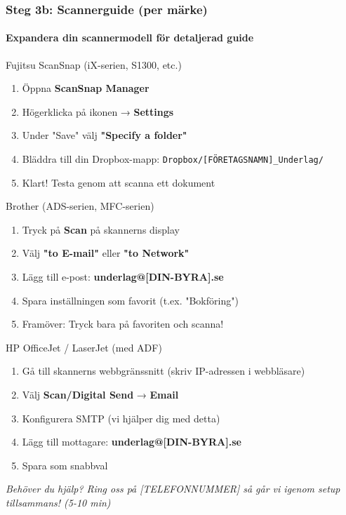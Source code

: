 \documentclass[10pt]{beamer}
\begin{document}
\begin{frame}[fragile]
  \frametitle{Steg 3b: Scannerguide (per märke)}
  \framesubtitle{Expandera din scannermodell för detaljerad guide}

  \begin{block}{Fujitsu ScanSnap (iX-serien, S1300, etc.)}
    \footnotesize
    \begin{enumerate}
      \item Öppna \textbf{ScanSnap Manager}
      \item Högerklicka på ikonen → \textbf{Settings}
      \item Under "Save" välj \textbf{"Specify a folder"}
      \item Bläddra till din Dropbox-mapp: \texttt{Dropbox/[FÖRETAGSNAMN]\_Underlag/}
      \item Klart! Testa genom att scanna ett dokument
    \end{enumerate}
  \end{block}

  \vspace{0.3cm}

  \begin{block}{Brother (ADS-serien, MFC-serien)}
    \footnotesize
    \begin{enumerate}
      \item Tryck på \textbf{Scan} på skannerns display
      \item Välj \textbf{"to E-mail"} eller \textbf{"to Network"}
      \item Lägg till e-post: \textbf{underlag@[DIN-BYRA].se}
      \item Spara inställningen som favorit (t.ex. "Bokföring")
      \item Framöver: Tryck bara på favoriten och scanna!
    \end{enumerate}
  \end{block}

  \vspace{0.3cm}

  \begin{block}{HP OfficeJet / LaserJet (med ADF)}
    \footnotesize
    \begin{enumerate}
      \item Gå till skannerns webbgränssnitt (skriv IP-adressen i webbläsare)
      \item Välj \textbf{Scan/Digital Send} → \textbf{Email}
      \item Konfigurera SMTP (vi hjälper dig med detta)
      \item Lägg till mottagare: \textbf{underlag@[DIN-BYRA].se}
      \item Spara som snabbval
    \end{enumerate}
  \end{block}

  \vspace{0.3cm}
  \footnotesize
  \textit{Behöver du hjälp? Ring oss på [TELEFONNUMMER] så går vi igenom setup tillsammans! (5-10 min)}

\end{frame}
\end{document}
